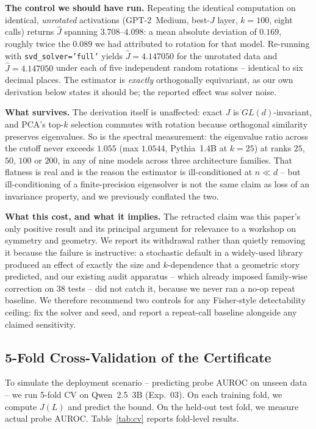 \documentclass[onecolumn]{jmlr}
\begin{document}
\textbf{The control we should have run.} Repeating the identical computation on
identical, \emph{unrotated} activations (GPT-2~Medium, best-$J$ layer, $k{=}100$,
eight calls) returns $\hat J$ spanning $3.708$--$4.098$: a mean absolute
deviation of $0.169$, roughly twice the $0.089$ we had attributed to rotation
for that model. Re-running with \texttt{svd\_solver='full'} yields
$\hat J=4.147050$ for the unrotated data and $\hat J=4.147050$ under each of
five independent random rotations -- identical to six decimal places. The
estimator is \emph{exactly} orthogonally equivariant, as our own derivation
below states it should be; the reported effect was solver noise.

\textbf{What survives.} The derivation itself is unaffected: exact $J$ is
$GL(d)$-invariant, and PCA's top-$k$ selection commutes with rotation because
orthogonal similarity preserves eigenvalues. So is the spectral measurement:
the eigenvalue ratio across the cutoff never exceeds $1.055$ (max $1.0544$,
Pythia~1.4B at $k{=}25$) at ranks $25$, $50$, $100$ or $200$, in any of nine
models across three architecture families. That flatness is real and is the
reason the estimator is ill-conditioned at $n{\ll}d$ -- but ill-conditioning of
a finite-precision eigensolver is not the same claim as loss of an invariance
property, and we previously conflated the two.

\textbf{What this cost, and what it implies.} The retracted claim was this
paper's only positive result and its principal argument for relevance to a
workshop on symmetry and geometry. We report its withdrawal rather than
quietly removing it because the failure is instructive: a stochastic default in
a widely-used library produced an effect of exactly the size and $k$-dependence
that a geometric story predicted, and our existing audit apparatus -- which
already imposed family-wise correction on 38 tests -- did not catch it, because
we never ran a no-op repeat baseline. We therefore recommend two controls for
any Fisher-style detectability ceiling: fix the solver and seed, and report a
repeat-call baseline alongside any claimed sensitivity.


\subsection{5-Fold Cross-Validation of the Certificate}
\label{sec:cert-cv}

To simulate the deployment scenario -- predicting probe AUROC on
unseen data -- we run 5-fold CV on Qwen~2.5~3B (Exp.~03). On each
training fold, we compute $J(L)$ and predict the bound. On the held-out
test fold, we measure actual probe AUROC. Table~\ref{tab:cv} reports
fold-level results.
\end{document}
